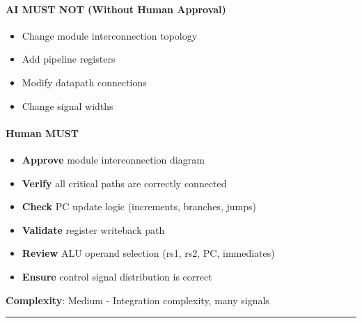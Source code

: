\paragraph{\texorpdfstring{\warn{} AI MUST NOT (Without Human
Approval)}{ AI MUST NOT (Without Human Approval)}}\label{cr:status:phase1-ai-human-responsibilities:warning-ai-must-not-without-human-approval-5}

\begin{record}

\begin{itemize}
\tightlist
\item
  Change module interconnection topology
\item
  Add pipeline registers
\item
  Modify datapath connections
\item
  Change signal widths
\end{itemize}

\end{record}

\paragraph{\texorpdfstring{\hold{} Human MUST}{ Human MUST}}\label{cr:status:phase1-ai-human-responsibilities:raised-hand-human-must-5}

\begin{record}

\begin{itemize}
\tightlist
\item
  \textbf{Approve} module interconnection diagram
\item
  \textbf{Verify} all critical paths are correctly connected
\item
  \textbf{Check} PC update logic (increments, branches, jumps)
\item
  \textbf{Validate} register writeback path
\item
  \textbf{Review} ALU operand selection (rs1, rs2, PC, immediates)
\item
  \textbf{Ensure} control signal distribution is correct
\end{itemize}

\textbf{Complexity}: \partialmark{} Medium - Integration complexity,
many signals

\begin{center}\rule{0.5\linewidth}{0.5pt}\end{center}

\end{record}

